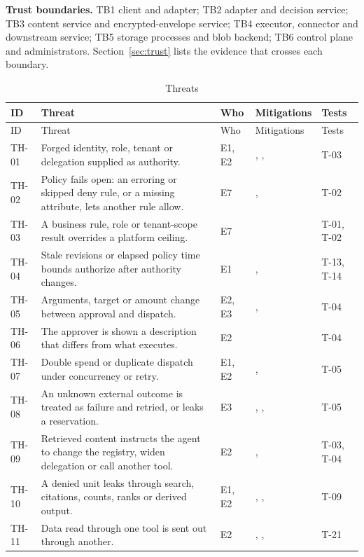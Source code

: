 \textbf{Trust boundaries.} TB1 client and adapter; TB2 adapter and decision service; TB3 content service and encrypted-envelope service; TB4 executor, connector and downstream service; TB5 storage processes and blob backend; TB6 control plane and administrators. Section~\ref{sec:trust} lists the evidence that crosses each boundary.
\begin{longtable}{@{}P{0.07\textwidth}P{0.34\textwidth}P{0.08\textwidth}P{0.29\textwidth}P{0.12\textwidth}@{}}
\caption{Threats}\label{tab:threats}\\
\toprule ID & Threat & Who & Mitigations & Tests\\\midrule\endfirsthead
\toprule ID & Threat & Who & Mitigations & Tests\\\midrule\endhead
TH-01 & Forged identity, role, tenant or delegation supplied as authority. & E1, E2 & , ,  & T-03\\
TH-02 & Policy fails open: an erroring or skipped deny rule, or a missing attribute, lets another rule allow. & E7 & ,  & T-02\\
TH-03 & A business rule, role or tenant-scope result overrides a platform ceiling. & E7 &  & T-01, T-02\\
TH-04 & Stale revisions or elapsed policy time bounds authorize after authority changes. & E1 & ,  & T-13, T-14\\
TH-05 & Arguments, target or amount change between approval and dispatch. & E2, E3 & ,  & T-04\\
TH-06 & The approver is shown a description that differs from what executes. & E2 &  & T-04\\
TH-07 & Double spend or duplicate dispatch under concurrency or retry. & E1, E2 & ,  & T-05\\
TH-08 & An unknown external outcome is treated as failure and retried, or leaks a reservation. & E3 & , ,  & T-05\\
TH-09 & Retrieved content instructs the agent to change the registry, widen delegation or call another tool. & E2 & ,  & T-03, T-04\\
TH-10 & A denied unit leaks through search, citations, counts, ranks or derived output. & E1, E2 & , ,  & T-09\\
TH-11 & Data read through one tool is sent out through another. & E2 & , ,  & T-21\\

\end{longtable}

